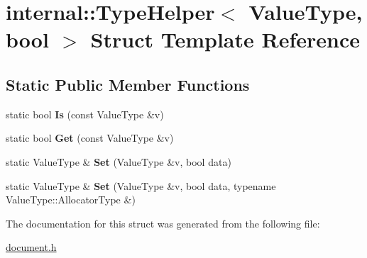 \hypertarget{a02028}{}\section{internal\+:\+:Type\+Helper$<$ Value\+Type, bool $>$ Struct Template Reference}
\label{a02028}
\subsection*{Static Public Member Functions}
\begin{DoxyCompactItemize}
\item 
\mbox{\label{a02028_aa73fb8b4ed649706f7f9165401f89c27}} 
static bool {\bfseries Is} (const Value\+Type \&v)
\item 
\mbox{\label{a02028_aed612b233e5985d049248b414fb0034a}} 
static bool {\bfseries Get} (const Value\+Type \&v)
\item 
\mbox{\label{a02028_a4bfa644e57e7d725468ed78103c1579a}} 
static Value\+Type \& {\bfseries Set} (Value\+Type \&v, bool data)
\item 
\mbox{\label{a02028_a01a2bdf4117fb767c8d703be9e0f5f1d}} 
static Value\+Type \& {\bfseries Set} (Value\+Type \&v, bool data, typename Value\+Type\+::\+Allocator\+Type \&)
\end{DoxyCompactItemize}


The documentation for this struct was generated from the following file\+:\begin{DoxyCompactItemize}
\item 
\hyperlink{a00476}{document.\+h}\end{DoxyCompactItemize}
